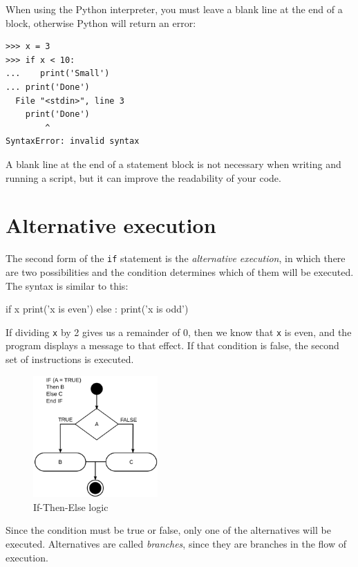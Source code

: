 When using the Python interpreter, you must leave a blank line at the end of a block, otherwise Python will return an error:

\begin{Verbatim}[frame=single]
>>> x = 3
>>> if x < 10:
...    print('Small')
... print('Done')
  File "<stdin>", line 3
    print('Done')
        ^
SyntaxError: invalid syntax
\end{Verbatim}

A blank line at the end of a statement block is not necessary when writing and running a script, but it can improve the readability of your code.

\hypertarget{ejecuciuxf3n-alternativa}{%
\section{Alternative execution}\label{ejecuciuxf3n-alternativa}}

 

The second form of the \texttt{if} statement is the \emph{alternative execution}, in which there are two possibilities and the condition determines which of them will be executed. The syntax is similar to this:

\begin{python}[frame=single]
if x%
    print('x is even')
else :
    print('x is odd')
\end{python}

If dividing \texttt{x} by 2 gives us a remainder of 0, then we know that \texttt{x} is even, and the program displays a message to that effect. If that condition is false, the second set of instructions is executed.

\begin{figure}[H]
\centering
\includegraphics[width=180px]{images/if-eng.png}
\caption{If-Then-Else logic}
\label{fig:if}
\end{figure}

Since the condition must be true or false, only one of the alternatives will be executed. Alternatives are called \emph{branches}, since they are branches in the flow of execution.

